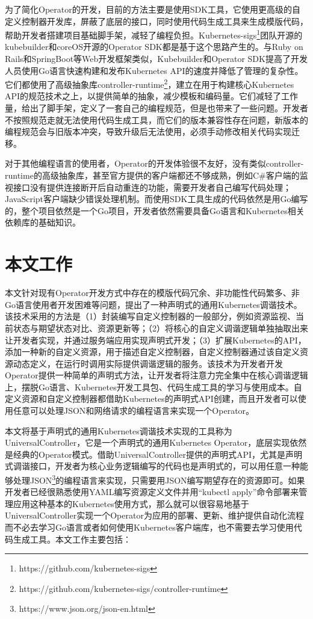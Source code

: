\documentclass[macfonts,master]{njuthesis}
\begin{document}
为了简化Operator的开发，目前的方法主要是使用SDK工具，它使用更高级的自定义控制器开发库，屏蔽了底层的接口，同时使用代码生成工具来生成模版代码，帮助开发者搭建项目基础脚手架，减轻了编程负担。Kubernetes-sigs\footnote{https://github.com/kubernetes-sigs}团队开源的kubebuilder和coreOS开源的Operator SDK都是基于这个思路产生的。与Ruby on Rails和SpringBoot等Web开发框架类似，Kubebuilder和Operator SDK提高了开发人员使用Go语言快速构建和发布Kubernetes API的速度并降低了管理的复杂性。它们都使用了高级抽象库controller-runtime\footnote{https://github.com/kubernetes-sigs/controller-runtime}，建立在用于构建核心Kubernetes API的规范技术之上，以提供简单的抽象，减少模板和编码量。它们减轻了工作量，给出了脚手架，定义了一套自己的编程规范，但是也带来了一些问题。开发者不按照规范走就无法使用代码生成工具，而它们的版本兼容性存在问题，新版本的编程规范会与旧版本冲突，导致升级后无法使用，必须手动修改相关代码实现迁移。

对于其他编程语言的使用者，Operator的开发体验很不友好，没有类似controller-runtime的高级抽象库，甚至官方提供的客户端都还不够成熟，例如C\#客户端的监视接口没有提供连接断开后自动重连的功能，需要开发者自己编写代码处理；JavaScript客户端缺少错误处理机制。而使用SDK工具生成的代码依然是用Go编写的，整个项目依然是一个Go项目，开发者依然需要具备Go语言和Kubernetes相关依赖库的基础知识\cite{problemofoperators}。

\section{本文工作}
本文针对现有Operator开发方式中存在的模版代码冗余、非功能性代码繁多、非Go语言使用者开发困难等问题，提出了一种声明式的通用Kubernetes调谐技术。该技术采用的方法是（1）封装编写自定义控制器的一般部分，例如资源监视、当前状态与期望状态对比、资源更新等；（2）将核心的自定义调谐逻辑单独抽取出来让开发者实现，并通过服务端应用实现声明式开发；（3）扩展Kubernetes的API，添加一种新的自定义资源，用于描述自定义控制器，自定义控制器通过该自定义资源动态定义，在运行时调用实际提供调谐逻辑的服务。该技术为开发者开发Operator提供一种简单的声明式方法，让开发者将注意力完全集中在核心调谐逻辑上，摆脱Go语言、Kubernetes开发工具包、代码生成工具的学习与使用成本。自定义资源和自定义控制器都借助Kubernetes的声明式API创建，而且开发者可以使用任意可以处理JSON和网络请求的编程语言来实现一个Operator。

本文将基于声明式的通用Kubernetes调谐技术实现的工具称为UniversalController，它是一个声明式的通用Kubernetes Operator，底层实现依然是经典的Operator模式。借助UniversalController提供的声明式API，尤其是声明式调谐接口，开发者为核心业务逻辑编写的代码也是声明式的，可以用任意一种能够处理JSON\footnote{https://www.json.org/json-en.html}的编程语言来实现，只需要用JSON编写期望存在的资源即可。如果开发者已经很熟悉使用YAML编写资源定义文件并用``kubectl apply''命令部署来管理应用这种基本的Kubernetes使用方式，那么就可以很容易地基于UniversalController实现一个Operator为应用的部署、更新、维护提供自动化流程而不必去学习Go语言或者如何使用Kubernetes客户端库，也不需要去学习使用代码生成工具。本文工作主要包括：
\end{document}
